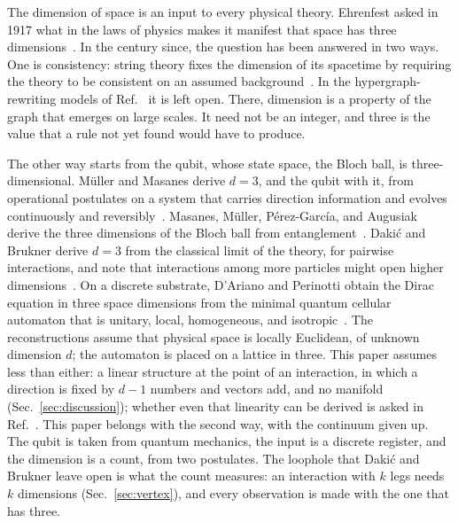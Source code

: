 \documentclass[aps,prd,twocolumn,superscriptaddress,nofootinbib]{revtex4-2}
\begin{document}
The dimension of space is an input to every physical theory. Ehrenfest asked in 1917 what in the laws of physics makes it manifest that space has three dimensions~\cite{ehrenfest1917}. In the century since, the question has been answered in two ways. One is consistency: string theory fixes the dimension of its spacetime by requiring the theory to be consistent on an assumed background~\cite{lovelace1971,goddard1972}. In the hypergraph-rewriting models of Ref.~\cite{wolfram2020} it is left open. There, dimension is a property of the graph that emerges on large scales. It need not be an integer, and three is the value that a rule not yet found would have to produce.

The other way starts from the qubit, whose state space, the Bloch ball, is three-dimensional. M\"uller and Masanes derive $d = 3$, and the qubit with it, from operational postulates on a system that carries direction information and evolves continuously and reversibly~\cite{muller2013}. Masanes, M\"uller, P\'erez-Garc\'ia, and Augusiak derive the three dimensions of the Bloch ball from entanglement~\cite{masanes2014}. Daki\'c and Brukner derive $d = 3$ from the classical limit of the theory, for pairwise interactions, and note that interactions among more particles might open higher dimensions~\cite{dakic2016}. On a discrete substrate, D'Ariano and Perinotti obtain the Dirac equation in three space dimensions from the minimal quantum cellular automaton that is unitary, local, homogeneous, and isotropic~\cite{dariano2014}. The reconstructions assume that physical space is locally Euclidean, of unknown dimension $d$; the automaton is placed on a lattice in three. This paper assumes less than either: a linear structure at the point of an interaction, in which a direction is fixed by $d-1$ numbers and vectors add, and no manifold (Sec.~\ref{sec:discussion}); whether even that linearity can be derived is asked in Ref.~\cite{muller2017}. This paper belongs with the second way, with the continuum given up. The qubit is taken from quantum mechanics, the input is a discrete register, and the dimension is a count, from two postulates. The loophole that Daki\'c and Brukner leave open is what the count measures: an interaction with $k$ legs needs $k$ dimensions (Sec.~\ref{sec:vertex}), and every observation is made with the one that has three.
\end{document}
